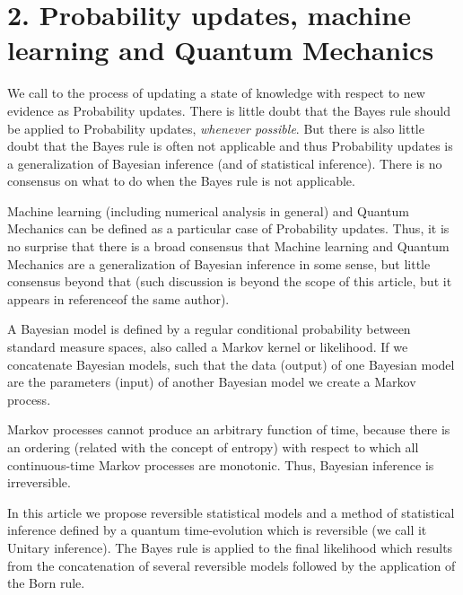 \documentclass[11pt]{book}
\begin{document}
\hypertarget{probability-updates-machine-learning-and-quantum-mechanics}{%
\section{2. Probability updates, machine learning and Quantum
Mechanics}\label{probability-updates-machine-learning-and-quantum-mechanics}}

We call to the process of updating a state of knowledge with respect to
new evidence as Probability
updates\cite{VanFraassen1993}.
There is little doubt that the Bayes rule should be applied to
Probability updates, \emph{whenever
possible}\cite{VanFraassen1993}.
But there is also little doubt that the Bayes rule is often not
applicable\cite{VanFraassen1993}
and thus Probability updates is a generalization of Bayesian inference
(and of statistical inference). There is no consensus on what to do when
the Bayes rule is not applicable.

Machine learning\cite{DeepCritical}
(including numerical analysis in
general\cite{hennig2022probabilistic}) and Quantum
Mechanics\cite{Streater2000Classical}
can be defined as a particular case of Probability updates. Thus, it is
no surprise that there is a broad consensus that Machine learning and
Quantum Mechanics are a generalization of Bayesian inference in some
sense, but little consensus beyond that (such discussion is beyond the
scope of this article, but it appears in
reference\cite{pedro_aligned_2023}of the
same author).

A Bayesian model\cite{seitz} is defined
by a regular conditional probability between standard measure spaces,
also called a Markov kernel or likelihood. If we concatenate Bayesian
models, such that the data (output) of one Bayesian model are the
parameters (input) of another Bayesian model we create a Markov process.

Markov processes cannot produce an arbitrary function of time, because
there is an ordering (related with the concept of entropy) with respect
to which all continuous-time Markov processes are
monotonic\cite{2010entropy}. Thus, Bayesian inference is irreversible.

In this article we propose reversible statistical models and a method of
statistical inference defined by a quantum time-evolution which is
reversible (we call it Unitary inference). The Bayes rule is applied to
the final likelihood which results from the concatenation of several
reversible models followed by the application of the Born rule.
\end{document}
